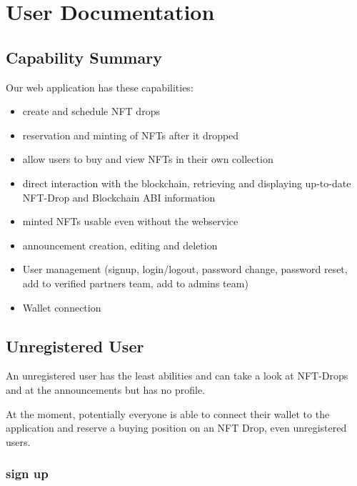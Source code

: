 \documentclass[
]{article}
\date{}
\providecommand{\tightlist}{%
  \setlength{\itemsep}{0pt}\setlength{\parskip}{0pt}}
\begin{document}
\hypertarget{user-documentation}{%
\section{User Documentation}\label{user-documentation}}

\hypertarget{capability-summary}{%
\subsection{Capability Summary}\label{capability-summary}}

Our web application has these capabilities:

\begin{itemize}
\tightlist
\item
  create and schedule NFT drops
\item
  reservation and minting of NFTs after it dropped
\item
  allow users to buy and view NFTs in their own collection
\item
  direct interaction with the blockchain, retrieving and displaying
  up-to-date NFT-Drop and Blockchain ABI information
\item
  minted NFTs usable even without the webservice
\item
  announcement creation, editing and deletion
\item
  User management (signup, login/logout, password change, password
  reset, add to verified partners team, add to admins team)
\item
  Wallet connection
\end{itemize}

\hypertarget{unregistered-user}{%
\subsection{Unregistered User}\label{unregistered-user}}

An unregistered user has the least abilities and can take a look at
NFT-Drops and at the announcements but has no profile.

At the moment, potentially everyone is able to connect their wallet to
the application and reserve a buying position on an NFT Drop, even
unregistered users.

\hypertarget{sign-up}{%
\subsubsection{sign up}\label{sign-up}}
\end{document}
